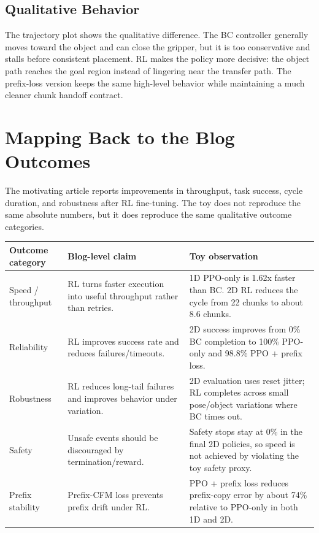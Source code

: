 \documentclass[11pt]{article}
\begin{document}
\subsection{Qualitative Behavior}

The trajectory plot shows the qualitative difference. The BC controller generally moves toward the object and can close the gripper, but it is too conservative and stalls before consistent placement. RL makes the policy more decisive: the object path reaches the goal region instead of lingering near the transfer path. The prefix-loss version keeps the same high-level behavior while maintaining a much cleaner chunk handoff contract.

\section{Mapping Back to the Blog Outcomes}

The motivating article reports improvements in throughput, task success, cycle duration, and robustness after RL fine-tuning. The toy does not reproduce the same absolute numbers, but it does reproduce the same qualitative outcome categories.

\begin{longtable}{p{}p{}p{}}
\toprule
Outcome category & Blog-level claim & Toy observation \\
\midrule
Speed / throughput & RL turns faster execution into useful throughput rather than retries. & 1D PPO-only is 1.62x faster than BC. 2D RL reduces the cycle from 22 chunks to about 8.6 chunks. \\
Reliability & RL improves success rate and reduces failures/timeouts. & 2D success improves from 0\% BC completion to 100\% PPO-only and 98.8\% PPO + prefix loss. \\
Robustness & RL reduces long-tail failures and improves behavior under variation. & 2D evaluation uses reset jitter; RL completes across small pose/object variations where BC times out. \\
Safety & Unsafe events should be discouraged by termination/reward. & Safety stops stay at 0\% in the final 2D policies, so speed is not achieved by violating the toy safety proxy. \\
Prefix stability & Prefix-CFM loss prevents prefix drift under RL. & PPO + prefix loss reduces prefix-copy error by about 74\% relative to PPO-only in both 1D and 2D. \\
\bottomrule
\end{longtable}
\end{document}
